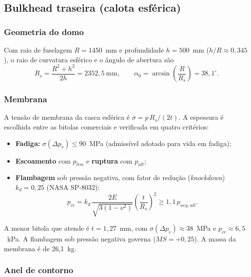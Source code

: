 \subsection{Bulkhead traseira (calota esférica)}

\subsubsection{Geometria do domo}

Com raio de fuselagem $R = 1450$~mm e profundidade $h = 500$~mm ($h/R \approx 0{,}345$), o raio de curvatura esférico e o ângulo de abertura são
\begin{equation}
    R_s = \dfrac{R^2 + h^2}{2h} = 2352{,}5~\text{mm}, \qquad \alpha_0 = \arcsin\!\left(\dfrac{R}{R_s}\right) = 38{,}1^\circ.
\end{equation}

\subsubsection{Membrana}

A tensão de membrana da casca esférica é $\sigma = p\,R_s/(2t)$. A espessura é escolhida entre as bitolas comerciais e verificada em quatro critérios:
\begin{itemize}
    \item \textbf{Fadiga:} $\sigma(\Delta p_{v}) \leq 90$~MPa (admissível adotado para vida em fadiga);
    \item \textbf{Escoamento} com $p_{lim}$ e \textbf{ruptura} com $p_{ult}$;
    \item \textbf{Flambagem} sob pressão negativa, com fator de redução (\emph{knockdown}) $k_d = 0{,}25$ (NASA SP-8032):
    \begin{equation}
        p_{cr} = k_d\,\dfrac{2E}{\sqrt{3(1-\nu^2)}}\left(\dfrac{t}{R_s}\right)^2 \geq 1{,}1\,p_{neg,ult}.
    \end{equation}
\end{itemize}
A menor bitola que atende é $t = 1{,}27$~mm, com $\sigma(\Delta p_{v}) \approx 38$~MPa e $p_{cr} \approx 6{,}5$~kPa. A flambagem sob pressão negativa governa ($MS = +0{,}25$). A massa da membrana é de 26,1~kg.

\subsubsection{Anel de contorno}

